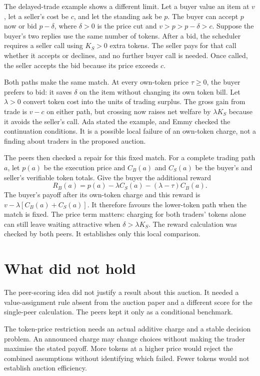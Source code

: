 \documentclass{article}
\begin{document}
The delayed-trade example shows a different limit. Let a buyer value an item at \(v\), let a
seller's cost be \(c\), and let the standing ask be \(p\). The buyer can accept \(p\) now or bid
\(p-\delta\), where \(\delta>0\) is the price cut and \(v>p>p-\delta>c\). Suppose the buyer's two
replies use the same number of tokens. After a bid, the scheduler requires a seller call using
\(K_S>0\) extra tokens. The seller pays for that call whether it accepts or declines, and no further
buyer call is needed. Once called, the seller accepts the bid because its price exceeds \(c\).

Both paths make the same match. At every own-token price \(\tau\geq0\), the buyer prefers to bid: it
saves \(\delta\) on the item without changing its own token bill. Let \(\lambda>0\) convert token
cost into the units of trading surplus. The gross gain from trade is \(v-c\) on either path, but
crossing now raises net welfare by \(\lambda K_S\) because it avoids the seller's call. Ada stated
the example, and Emmy checked the continuation conditions. It is a possible local failure of an
own-token charge, not a finding about traders in the proposed auction.

The peers then checked a repair for this fixed match. For a complete trading path \(a\), let
\(p(a)\) be the execution price and \(C_B(a)\) and \(C_S(a)\) be the buyer's and seller's verifiable
token totals. Give the buyer the additional reward
\[
R_B(a)=p(a)-\lambda C_S(a)-(\lambda-\tau)C_B(a).
\]
The buyer's payoff after its own-token charge and this reward is \(v-\lambda[C_B(a)+C_S(a)]\). It
therefore favours the lower-token path when the match is fixed. The price term matters: charging for
both traders' tokens alone can still leave waiting attractive when \(\delta>\lambda K_S\). The
reward calculation was checked by both peers. It establishes only this local comparison.

\section{What did not hold}

The peer-scoring idea did not justify a result about this auction. It needed a value-assignment rule
absent from the auction paper and a different score for the single-peer calculation. The peers kept
it only as a conditional benchmark.

The token-price restriction needs an actual additive charge and a stable decision problem. An
announced charge may change choices without making the trader maximise the stated payoff. More
tokens at a higher price would reject the combined assumptions without identifying which failed.
Fewer tokens would not establish auction efficiency.
\end{document}
